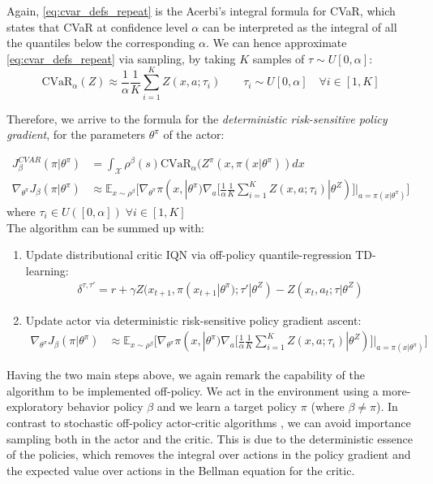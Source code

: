 Again, \ref{eq:cvar_defs_repeat} is the Acerbi's integral formula for CVaR, which
states that CVaR at confidence level $\alpha$ can be interpreted as the integral of all the quantiles
below the corresponding $\alpha$.
We can hence approximate \eqref{eq:cvar_defs_repeat} via sampling, by taking $K$ samples of 
$\tau \sim U[0,\alpha]$:
\begin{equation}
\text{CVaR}_\alpha (Z) \approx \frac{1}{\alpha} \frac{1}{K}\sum_{i=1}^KZ(x,a; \tau_i)
\qquad \tau_i \sim U[0,\alpha] \quad \forall i \in [1,K]
\end{equation}

Therefore, we arrive to the formula for the \textit{deterministic risk-sensitive policy gradient},
for the parameters $\theta^\pi$ of the actor: 

\begin{align}
    J_\beta^{CVAR}(\pi | \theta^\pi) &= \int_\mathcal{X} \rho^\beta(s)\text{CVaR}_\alpha(Z^\pi(x,\pi (x| \theta^\pi))dx \nonumber\\
    \nabla_{\theta^\pi} J_\beta(\pi | \theta^\pi) &\approx \mathbb E_{x \sim \rho^\beta} 
    \big [\nabla_{\theta^\pi} \pi(x,| \theta^\pi) \nabla_a  [\frac{1}{\alpha} \frac{1}{K}
    \sum_{i=1}^K Z(x,a; \tau_i) | \theta^Z)]|_{a=\pi(x| \theta^\pi)}  \big]
    \label{eq:actor_grad}
\end{align}
where $\tau_i \in U([0,\alpha]) \; \forall i \in [1,K]$\\


The algorithm can be summed up with:

\begin{enumerate}
    \item Update distributional critic IQN via off-policy quantile-regression TD-learning:
    \begin{align}
        \delta^{\tau, \tau'} = r + \gamma Z(x_{t+1},\pi(x_{t+1}|\theta^\pi);\tau'| \theta^Z)-Z(x_t,a_t;\tau|\theta^Z) \nonumber
    \end{align}
    \item Update actor via deterministic risk-sensitive policy gradient ascent:
    \begin{align}
        \nabla_{\theta^\pi} J_\beta(\pi | \theta^\pi) &\approx \mathbb E_{x \sim \rho^\beta} 
    \big [\nabla_{\theta^\pi} \pi(x,| \theta^\pi) \nabla_a  [\frac{1}{\alpha} \frac{1}{K}
    \sum_{i=1}^K Z(x,a; \tau_i) | \theta^Z)]|_{a=\pi(x| \theta^\pi)}  \big] \nonumber
    \end{align}
\end{enumerate}

Having the two main steps above, we again remark the capability of the algorithm to be
implemented off-policy. We act in the environment using 
a more-exploratory behavior policy $\beta$ and we learn a
target policy $\pi$ (where $\beta \neq \pi$).
In contrast to stochastic off-policy actor-critic algorithms \citep{Degris2012}, we can avoid
importance sampling both in the actor and the critic.
This is due to the deterministic essence of the policies, which removes the integral over actions
in the policy gradient and the expected value over actions in the Bellman equation for the critic.
